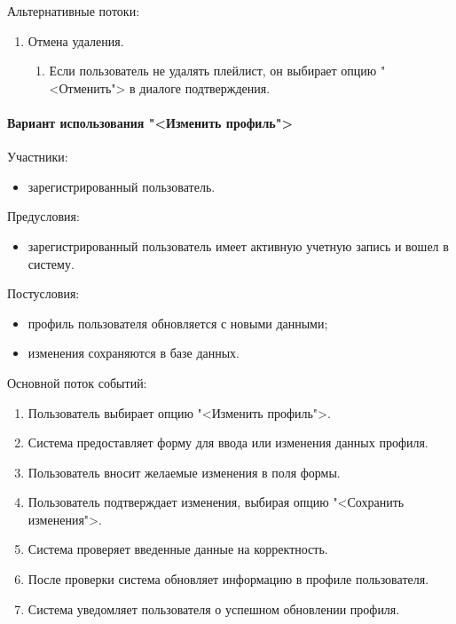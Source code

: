 Альтернативные потоки:
\begin{enumerate}
	\item Отмена удаления.
	\begin{enumerate}
		\item Если пользователь не удалять плейлист, он выбирает опцию "<Отменить"> в диалоге подтверждения.
	\end{enumerate}
\end{enumerate}

\paragraph{Вариант использования "<Изменить профиль">}

Участники:
\begin{itemize}
	\item зарегистрированный пользователь.
\end{itemize}

Предусловия:
\begin{itemize}
	\item зарегистрированный пользователь имеет активную учетную запись и вошел в систему.
\end{itemize}

Постусловия:
\begin{itemize}
	\item профиль пользователя обновляется с новыми данными;
	\item изменения сохраняются в базе данных.
\end{itemize}

Основной поток событий:
\begin{enumerate}
	\item Пользователь выбирает опцию "<Изменить профиль">.
	\item Система предоставляет форму для ввода или изменения данных профиля.
	\item Пользователь вносит желаемые изменения в поля формы.
	\item Пользователь подтверждает изменения, выбирая опцию "<Сохранить изменения">.
	\item Система проверяет введенные данные на корректность.
	\item После проверки система обновляет информацию в профиле пользователя.
	\item Система уведомляет пользователя о успешном обновлении профиля.
\end{enumerate}

